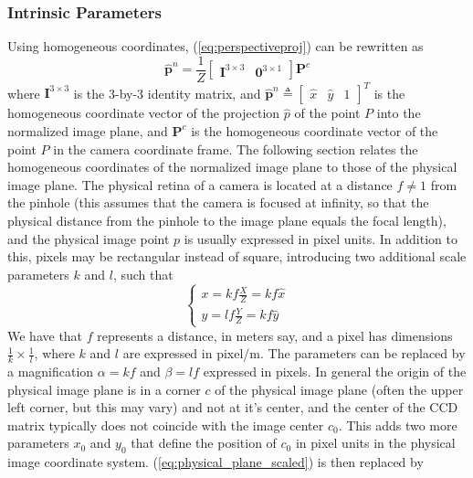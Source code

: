 \subsubsection{Intrinsic Parameters}
\label{section:intrinsic_params}
Using homogeneous coordinates, (\ref{eq:perspectiveproj}) can be rewritten as
\begin{equation}
\label{eq:homo}
\mathbf{\hat{p}}^n=\frac{1}{Z}\begin{bmatrix}\mathbf{I}^{3\times3} & \mathbf{0}^{3\times1}\end{bmatrix}\mathbf{P}^c
\end{equation}
where $\mathbf{I}^{3\times3}$ is the 3-by-3 identity matrix, and $\mathbf{\hat{p}}^n\triangleq \begin{bmatrix}\hat{x}&\hat{y}&1\end{bmatrix}^T$ is the homogeneous coordinate vector of the projection $\hat{p}$ of the point $P$ into the normalized image plane, and $\mathbf{P}^c$ is the homogeneous coordinate vector of the point $P$ in the camera coordinate frame. The following section relates the homogeneous coordinates of the normalized image plane to those of the physical image plane. The physical retina of a camera is located at a distance $f\neq1$ from the pinhole (this assumes that the camera is focused at infinity, so that the physical distance from the pinhole to the image plane equals the focal length), and the physical image point $p$ is usually expressed in pixel units. In addition to this, pixels may be rectangular instead of square, introducing two additional scale parameters $k$ and $l$, such that
\begin{equation}
\label{eq:physical_plane_scaled}
    \begin{cases}
    x=kf\frac{X}{Z}=kf\hat{x}\\
    y=lf\frac{Y}{Z}=kf\hat{y}
    \end{cases}
\end{equation}
We have that $f$ represents a distance, in meters say, and a pixel has dimensions $\frac{1}{k}\times\frac{1}{l}$, where $k$ and $l$ are expressed in pixel/m. The parameters can be replaced by a magnification $\alpha=kf$ and $\beta=lf$ expressed in pixels. In general the origin of the physical image plane is in a corner $c$ of the physical image plane (often the upper left corner, but this may vary) and not at it's center, and the center of the CCD matrix typically does not coincide with the image center $c_0$. This adds two more parameters $x_0$ and $y_0$ that define the position of $c_0$ in pixel units in the physical image coordinate system. (\ref{eq:physical_plane_scaled}) is then replaced by
